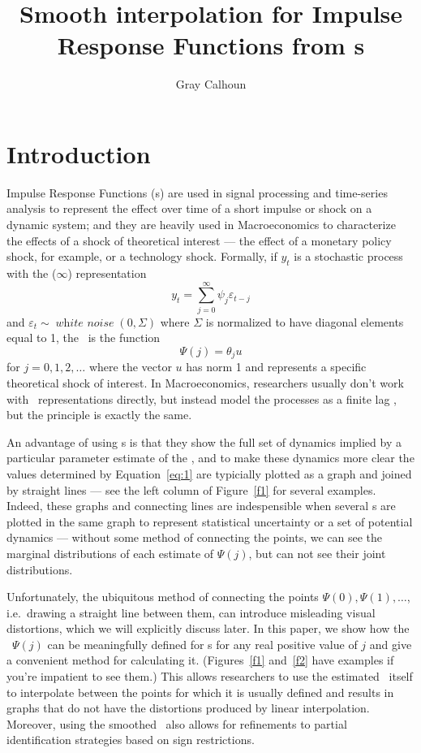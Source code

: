 \documentclass[12pt,fleqn]{article}
\title{Smooth interpolation for Impulse Response Functions from \allcaps{svar}s}
\author{Gray Calhoun}
\DeclareMathOperator{\whitenoise}{\mathit{white\ noise}}
\newcommand{\vep}{\varepsilon}
\begin{document}
\maketitle

\section{Introduction}

Impulse Response Functions (\IRF s) are used in signal processing and
time-series analysis to represent the effect over time of a short
impulse or shock on a dynamic system; and they are heavily used in
Macroeconomics to characterize the effects of a shock of theoretical
interest --- the effect of a monetary policy shock, for example, or a
technology shock. Formally, if $y_t$ is a stochastic process with the
\MA($\infty$) representation
\begin{equation*}
  y_t = \sum_{j=0}^{\infty} \psi_j \vep_{t-j}
\end{equation*}
and $\vep_t \sim \whitenoise(0,\Sigma)$ where $\Sigma$ is normalized
to have diagonal elements equal to 1, the \IRF\ is the function
\begin{equation}\label{eq:1}
  \Psi(j) = \theta_j u
\end{equation}
for $j = 0, 1, 2,\dots$ where the vector $u$ has norm 1 and represents
a specific theoretical shock of interest. In Macroeconomics,
researchers usually don't work with \MA\ representations directly, but
instead model the processes as a finite lag \VAR, but the principle is
exactly the same.

An advantage of using \IRF s is that they show the full set of
dynamics implied by a particular parameter estimate of the \VAR, and
to make these dynamics more clear the values determined by
Equation~\eqref{eq:1} are typicially plotted as a graph and joined by
straight lines --- see the left column of Figure~\ref{f1} for several
examples. Indeed, these graphs and connecting lines are indespensible
when several \IRF s are plotted in the same graph to represent
statistical uncertainty or a set of potential dynamics --- without
some method of connecting the points, we can see the marginal
distributions of each estimate of $\Psi(j)$, but can not see their
joint distributions.

Unfortunately, the ubiquitous method of connecting the points
$\Psi(0), \Psi(1),\dots$, i.e.\ drawing a straight line between them,
can introduce misleading visual distortions, which we will explicitly
discuss later. In this paper, we show how the \IRF\ $\Psi(j)$ can be
meaningfully defined for \VAR s for any real positive value of $j$ and
give a convenient method for calculating it. (Figures~\ref{f1}
and~\ref{f2} have examples if you're impatient to see them.) This
allows researchers to use the estimated \VAR\ itself to interpolate
between the points for which it is usually defined and results in
graphs that do not have the distortions produced by linear
interpolation. Moreover, using the smoothed \IRF\ also allows for
refinements to partial identification strategies based on sign
restrictions.
\end{document}
